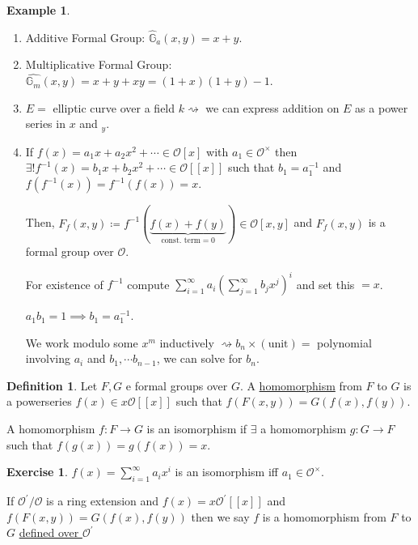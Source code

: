 \documentclass[openany]{amsbook}
\numberwithin{section}{chapter}
\theoremstyle{definition}
\newtheorem*{example}{Example}
\newtheorem*{definition}{Definition}
\newtheorem*{exercise}{Exercise}
\begin{document}
\begin{example}
    \begin{enumerate}[label=\arabic*)]
        \item Additive Formal Group: \(\widehat{\mathbb{G}}_a(x,y) = x+y\).
        \item Multiplicative Formal Group: \(\widehat{\mathbb{G}_m}(x,y) = x + y + xy = (1+x)(1+y)-1\).
        \item \(E = \) elliptic curve over a field \(k \rightsquigarrow\) we can express addition on \(E\) as a power series in \(x\) and \(_y\).
        \item If \(f(x) = a_1 x + a_2 x^2 + \cdots \in \mathcal{O} [x]\) with \(a_1\in \mathcal{O}^\times\) then \(\exists ! f ^{-1} (x) = b_1 x + b_2 x^2 + \cdots \in \mathcal{O} [[x]]\) such that \(b_1 = a_1 ^{-1}\) and \(f(f ^{-1} (x)) = f ^{-1} (f(x)) = x\).
        
        Then, \(F_f(x,y) \coloneqq f ^{-1} (\underbrace{f(x) + f(y)}_{\text{const. term} = 0 }) \in \mathcal{O}[x,y]\) and \(F_f(x,y)\) is a formal group over \(\mathcal{O}\).

        For existence of \(f ^{-1} \) compute \(\sum_{i=1}^{\infty} a_i \left( \sum_{j=1}^{\infty} b_j x^j \right) ^ i \) and set this \(= x\).
        
        \(a_1 b_1 = 1 \implies b_1 = a_1 ^{-1}\).

        We work modulo some \(x^{m}\) inductively \( \rightsquigarrow b_n \times (\text{unit}) =\) polynomial involving \(a_i\) and \(b_1, \cdots b_{n-1}\), we can solve for \(b_n\). 
    \end{enumerate} 
\end{example}

\begin{definition}
    Let \(F,G\) e formal groups over \(G\). A \underline{homomorphism} from \(F\) to \(G\) is a powerseries \(f(x) \in x \mathcal{O} [[x]]\) such that \(f(F(x,y)) = G(f(x),f(y))\).
    
    A homomorphism \(f: F \to G\) is an isomorphism if \(\exists\) a homomorphism \(g : G \to F\) such that \(f(g(x)) = g(f(x)) = x\).
\end{definition}

\begin{exercise}
    \(f(x) = \sum_{i=1}^{\infty} a_i x^i \) is an isomorphism iff \(a_1 \in \mathcal{O} ^\times \).
\end{exercise}

If \(\mathcal{O} ^{\prime} / \mathcal{O}\) is a ring extension and \(f(x) = x \mathcal{O} ^{\prime} [[x]]\) and \(f(F(x,y)) = G(f(x),f(y))\) then we say \(f\) is a homomorphism from \(F\) to \(G\) \underline{defined over \(\mathcal{O} ^{\prime} \)}
\end{document}
